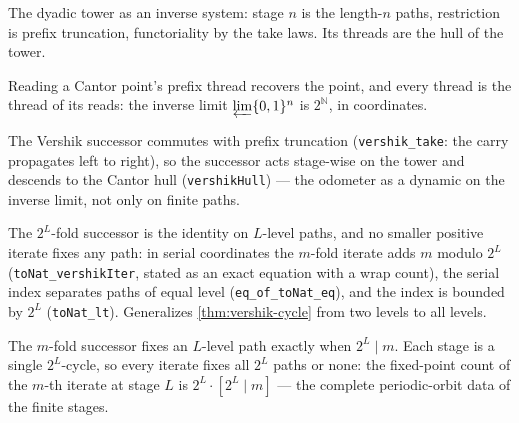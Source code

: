 \begin{proposition}\label{thm:dyadic-tower}\leanok{}
The dyadic tower as an inverse system: stage $n$ is the length-$n$ paths,
restriction is prefix truncation, functoriality by the take laws. Its
threads are the hull of the tower.
\end{proposition}

\begin{theorem}\label{thm:dyadic-hull-cantor}\leanok{}
Reading a Cantor point's prefix thread recovers the point, and every thread
is the thread of its reads: the inverse limit $\varprojlim \{0,1\}^n$ is
$2^{\mathbb{N}}$, in coordinates.
\end{theorem}

\begin{theorem}\label{thm:vershik-tower-endomorphism}\leanok{}
The Vershik successor commutes with prefix truncation
(\texttt{vershik\_take}: the carry propagates left to right), so the
successor acts stage-wise on the tower and descends to the Cantor hull
(\texttt{vershikHull}) --- the odometer as a dynamic on the inverse limit,
not only on finite paths.
\end{theorem}

\begin{theorem}\label{thm:vershik-cycle-full}\leanok{}
The $2^L$-fold successor is the identity on $L$-level paths, and no smaller
positive iterate fixes any path: in serial coordinates the $m$-fold iterate
adds $m$ modulo $2^L$ (\texttt{toNat\_vershikIter}, stated as an exact
equation with a wrap count), the serial index separates paths of equal level
(\texttt{eq\_of\_toNat\_eq}), and the index is bounded by $2^L$
(\texttt{toNat\_lt}). Generalizes \cref{thm:vershik-cycle} from two levels to
all levels.
\end{theorem}

\begin{theorem}\label{thm:vershik-periodic-law}\leanok{}
The $m$-fold successor fixes an $L$-level path exactly when $2^L \mid m$.
Each stage is a single $2^L$-cycle, so every iterate fixes all $2^L$ paths
or none: the fixed-point count of the $m$-th iterate at stage $L$ is
$2^L \cdot [2^L \mid m]$ --- the complete periodic-orbit data of the finite
stages.
\end{theorem}

